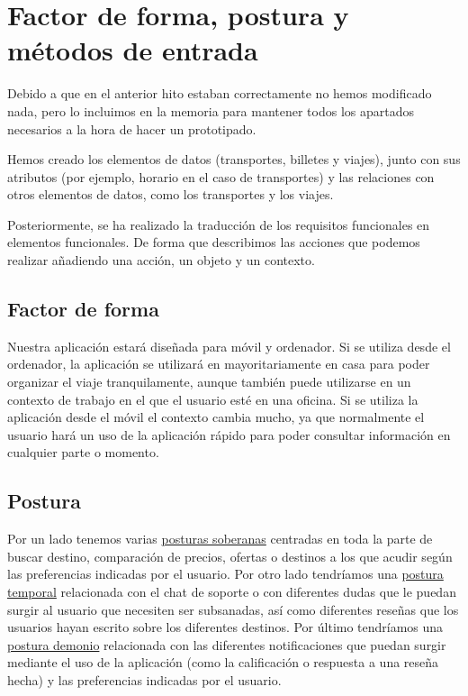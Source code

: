 \section{Factor de forma, postura y métodos de entrada}

Debido a que en el anterior hito estaban correctamente no hemos modificado nada, pero lo
incluimos en la memoria para mantener todos los apartados necesarios a la hora de hacer un prototipado.

Hemos creado los elementos de datos (transportes, billetes y viajes), junto con
sus atributos (por ejemplo, horario en el caso de transportes) y las relaciones
con otros elementos de datos, como los transportes y los viajes.

Posteriormente, se ha realizado la traducción de los requisitos funcionales en
elementos funcionales. De forma que describimos las acciones que podemos
realizar añadiendo una acción, un objeto y un contexto.

\subsection{Factor de forma}
Nuestra aplicación estará diseñada para móvil y ordenador. Si se utiliza desde
el ordenador, la aplicación se utilizará en mayoritariamente en casa para poder
organizar el viaje tranquilamente, aunque también puede utilizarse en un
contexto de trabajo en el que el usuario esté en una oficina. Si se utiliza la aplicación desde el
móvil el contexto cambia mucho, ya que normalmente el usuario hará un uso de la aplicación rápido para poder consultar información en cualquier parte o momento.

\subsection{Postura}
Por un lado tenemos varias \underline{posturas soberanas} centradas en toda la
parte de buscar destino, comparación de precios, ofertas o destinos a los que
acudir según las preferencias indicadas por el usuario. Por otro lado
tendríamos una \underline{postura temporal} relacionada con el chat de soporte
o con diferentes dudas que le puedan surgir al usuario que necesiten ser
subsanadas, así como diferentes reseñas que los usuarios hayan escrito sobre
los diferentes destinos. Por último tendríamos una \underline{postura demonio}
relacionada con las diferentes notificaciones que puedan surgir mediante el uso
de la aplicación (como la calificación o respuesta a una reseña hecha) y las
preferencias indicadas por el usuario.

